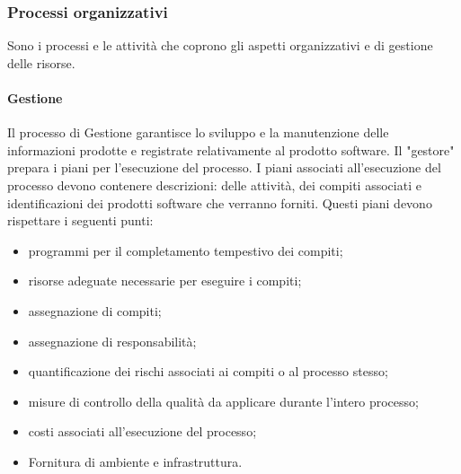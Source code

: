 \subsubsection{Processi organizzativi}
Sono i processi e le attività che coprono gli aspetti organizzativi e di gestione delle risorse.

\paragraph{Gestione}
Il processo di Gestione garantisce lo sviluppo e la manutenzione delle informazioni prodotte e registrate relativamente 
al prodotto software. Il "gestore" prepara i piani per l'esecuzione del processo.
I piani associati all'esecuzione del processo devono contenere descrizioni: delle attività, dei compiti associati e
identificazioni dei prodotti software che verranno forniti. Questi piani devono rispettare i seguenti punti:
\begin{itemize}
    \item programmi per il completamento tempestivo dei compiti;
    \item risorse adeguate necessarie per eseguire i compiti;
    \item assegnazione di compiti;
    \item assegnazione di responsabilità;
    \item quantificazione dei rischi associati ai compiti o al processo stesso;
    \item misure di controllo della qualità da applicare durante l'intero processo;
    \item costi associati all'esecuzione del processo;
    \item Fornitura di ambiente e infrastruttura.
\end{itemize}

